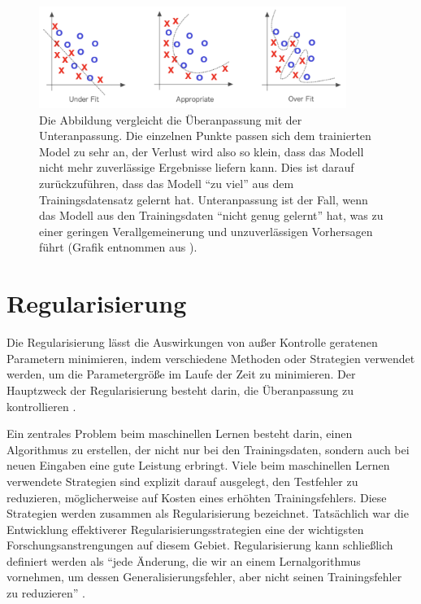         \begin{figure}[H]
            \centering
            \includegraphics[width=10cm]{kapitel2/overundefit.png}
            \caption[Vergleich der Unteranpassung mit der Überanpassung]{Die Abbildung vergleicht die Überanpassung mit der Unteranpassung. Die einzelnen Punkte passen sich dem trainierten Model zu sehr an, der Verlust wird also so klein, dass das Modell nicht mehr zuverlässige Ergebnisse liefern kann. Dies ist darauf zurückzuführen, dass das Modell \enquote{zu viel} aus dem Trainingsdatensatz gelernt hat. Unteranpassung ist der Fall, wenn das Modell aus den Trainingsdaten \enquote{nicht genug gelernt} hat, was zu einer geringen Verallgemeinerung und unzuverlässigen Vorhersagen führt (Grafik entnommen aus \cite*[27]{Patterson2019}). }
            \label{Kap2:OverUnder}
        \end{figure}

        \section{Regularisierung}
        Die Regularisierung lässt die Auswirkungen von außer Kontrolle geratenen Parametern minimieren, indem verschiedene Methoden oder Strategien verwendet werden, um die Parametergröße im Laufe der Zeit zu minimieren. Der Hauptzweck der Regularisierung besteht darin, die Überanpassung zu kontrollieren \cite*[79]{Patterson2019}.

        Ein zentrales Problem beim maschinellen Lernen besteht darin, einen Algorithmus zu erstellen, der nicht nur bei den Trainingsdaten, sondern auch bei neuen Eingaben eine gute Leistung erbringt. Viele beim maschinellen Lernen verwendete Strategien sind explizit darauf ausgelegt, den Testfehler zu reduzieren, möglicherweise auf Kosten eines erhöhten Trainingsfehlers. Diese Strategien werden zusammen als Regularisierung bezeichnet. Tatsächlich war die Entwicklung effektiverer Regularisierungsstrategien eine der wichtigsten Forschungsanstrengungen auf diesem Gebiet. Regularisierung kann schließlich definiert werden als \enquote{jede Änderung, die wir an einem Lernalgorithmus vornehmen, um dessen Generalisierungsfehler, aber nicht seinen Trainingsfehler zu reduzieren} \cite*[228]{IanGoodfellowYoshuaBengio2016}.

